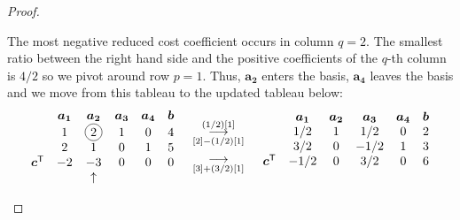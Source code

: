 \documentclass[12pt]{article}
\newcommand*\circled[1]{\tikz[baseline=(char.base)]{
            \node[shape=circle,draw,inner sep=2pt] (char) {#1};}}
\theoremstyle{definition}
\newcommand{\vc}[1]{\boldsymbol{#1}}
\newcommand{\grstep}[2][\relax]{%
   \ensuremath{\mathrel{
       {\mathop{\longrightarrow}\limits^{#2\mathstrut}_{
                                     \begin{subarray}{l} #1 \end{subarray}}}}}}
\newcommand{\tran}{\mathsf{T}}
\begin{document}
\begin{proof}
\begin{enumerate}
      The most negative reduced cost coefficient occurs in column $q=2$. The smallest ratio between the
      right hand side and the positive coefficients of the $q$-th column is $4/2$ so we pivot around
      row $p=1$. Thus, $\vc{a_2}$ enters the basis, $\vc{a_4}$ leaves the basis and we move from this tableau
      to the updated tableau below:
      \begin{align*}
        \begin{matrix}
          & \vc{a_1} & \vc{a_2} & \vc{a_3} & \vc{a_4} & \vc{b} \\
          & 1 & \circled{2} & 1 & 0 & 4 \\
          & 2 & 1 & 0 & 1 & 5 \\
          \vc{c}^\tran & -2 & -3  & 0 & 0 & 0 \\
          & & \uparrow & & & \\
        \end{matrix}
        \quad
        \begin{array}{c}
          \grstep[{[2] - (1/2)[1]}]{(1/2)[1]} \\
          \grstep[{[3] + (3/2)[1]}]{} \\
        \end{array}
        \quad
        \begin{matrix}
          & \vc{a_1} & \vc{a_2} & \vc{a_3} & \vc{a_4} & \vc{b} \\
          & 1/2 & 1 & 1/2 & 0 & 2 \\
          & 3/2 & 0 & -1/2 & 1 & 3 \\
          \vc{c}^\tran & -1/2 & 0  & 3/2 & 0 & 6 \\
          & &  & & & \\
        \end{matrix}
      \end{align*}


\end{enumerate}
\end{proof}
\end{document}
